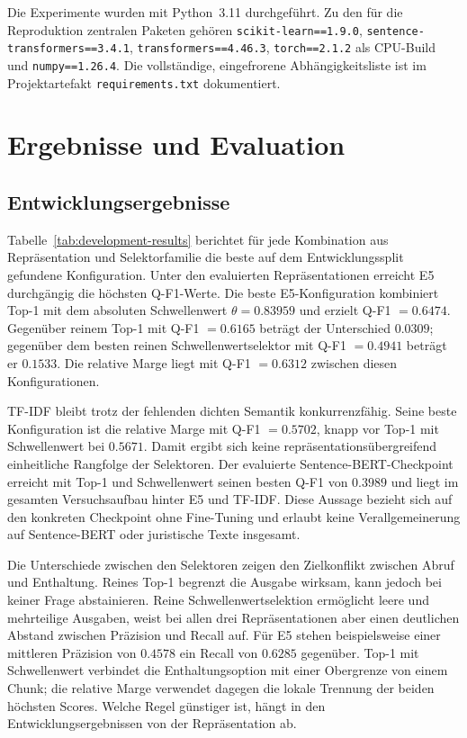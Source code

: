 \documentclass[11pt]{article}
\begin{document}
Die Experimente wurden mit Python~3.11 durchgeführt. Zu den für die Reproduktion zentralen Paketen gehören \texttt{scikit-learn==1.9.0}, \texttt{sentence-transformers==3.4.1}, \texttt{transformers==4.46.3}, \texttt{torch==2.1.2} als CPU-Build und \texttt{numpy==1.26.4}. Die vollständige, eingefrorene Abhängigkeitsliste ist im Projektartefakt \texttt{requirements.txt} dokumentiert.


\section{Ergebnisse und Evaluation}

\subsection{Entwicklungsergebnisse}

Tabelle~\ref{tab:development-results} berichtet für jede Kombination aus Repräsentation und Selektorfamilie die beste auf dem Entwicklungssplit gefundene Konfiguration. Unter den evaluierten Repräsentationen erreicht E5 durchgängig die höchsten Q-F1-Werte. Die beste E5-Konfiguration kombiniert Top-1 mit dem absoluten Schwellenwert $\theta=0.83959$ und erzielt Q-F1 $=0.6474$. Gegenüber reinem Top-1 mit Q-F1 $=0.6165$ beträgt der Unterschied $0.0309$; gegenüber dem besten reinen Schwellenwertselektor mit Q-F1 $=0.4941$ beträgt er $0.1533$. Die relative Marge liegt mit Q-F1 $=0.6312$ zwischen diesen Konfigurationen.

TF-IDF bleibt trotz der fehlenden dichten Semantik konkurrenzfähig. Seine beste Konfiguration ist die relative Marge mit Q-F1 $=0.5702$, knapp vor Top-1 mit Schwellenwert bei $0.5671$. Damit ergibt sich keine repräsentationsübergreifend einheitliche Rangfolge der Selektoren. Der evaluierte Sentence-BERT-Checkpoint erreicht mit Top-1 und Schwellenwert seinen besten Q-F1 von $0.3989$ und liegt im gesamten Versuchsaufbau hinter E5 und TF-IDF. Diese Aussage bezieht sich auf den konkreten Checkpoint ohne Fine-Tuning und erlaubt keine Verallgemeinerung auf Sentence-BERT oder juristische Texte insgesamt.

Die Unterschiede zwischen den Selektoren zeigen den Zielkonflikt zwischen Abruf und Enthaltung. Reines Top-1 begrenzt die Ausgabe wirksam, kann jedoch bei keiner Frage abstainieren. Reine Schwellenwertselektion ermöglicht leere und mehrteilige Ausgaben, weist bei allen drei Repräsentationen aber einen deutlichen Abstand zwischen Präzision und Recall auf. Für E5 stehen beispielsweise einer mittleren Präzision von $0.4578$ ein Recall von $0.6285$ gegenüber. Top-1 mit Schwellenwert verbindet die Enthaltungsoption mit einer Obergrenze von einem Chunk; die relative Marge verwendet dagegen die lokale Trennung der beiden höchsten Scores. Welche Regel günstiger ist, hängt in den Entwicklungsergebnissen von der Repräsentation ab.
\end{document}
